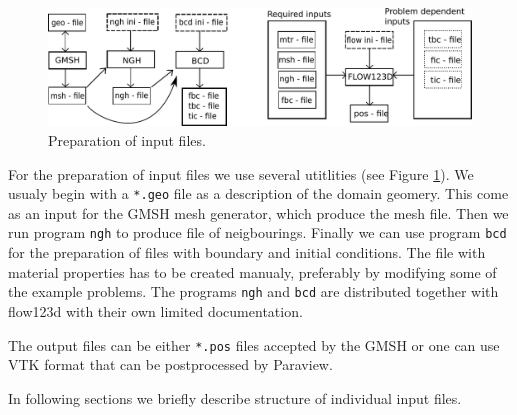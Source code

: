  \begin{figure}[h]
    \begin{center}
      \includegraphics[scale=0.7]{schema.pdf} %
      \caption{Preparation of input files.}
      \label{obr3}
    \end{center}
  \end{figure}


For the preparation of input files we use several utitlities (see Figure \ref{obr3}). 
We usualy begin with a \verb'*.geo' file as a description of the domain geomery. This come as an input for the GMSH mesh generator, which produce 
the mesh file. Then we run program \verb'ngh' to produce file of neigbourings. Finally we can use program \verb'bcd' for the preparation of files with
boundary and initial conditions. The file with material properties has to be created manualy, preferably by modifying some of the example problems.
The programs \verb'ngh' and \verb'bcd' are distributed together with flow123d with their own limited documentation.

The output files can be either \verb'*.pos' files accepted by the GMSH or one can use VTK format that can be postprocessed by Paraview.

In following sections we briefly describe structure of individual input files.

